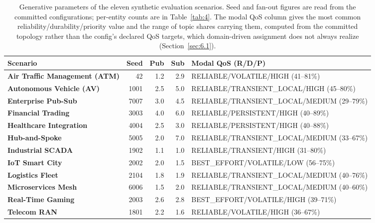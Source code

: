 \begin{table}[htbp]
\centering
\small
\caption{Generative parameters of the eleven synthetic evaluation scenarios. Seed and fan-out figures are read from the committed configurations; per-entity counts are in Table~\ref{tab:4}. The modal QoS column gives the most common reliability/durability/priority value and the range of topic shares carrying them, computed from the committed topology rather than the config's declared QoS targets, which domain-driven assignment does not always realize (Section~\ref{sec:6.1}).}
\label{tab:genparams}
\begin{tabular}{lrrrl}
\toprule
\textbf{Scenario} & \textbf{Seed} & \textbf{Pub} & \textbf{Sub} & \textbf{Modal QoS (R/D/P)} \\
\midrule
\textbf{Air Traffic Management (ATM)} & 42 & 1.2 & 2.9 & RELIABLE/VOLATILE/HIGH (41--81\%) \\
\textbf{Autonomous Vehicle (AV)} & 1001 & 2.5 & 5.0 & RELIABLE/TRANSIENT\_LOCAL/HIGH (45--80\%) \\
\textbf{Enterprise Pub-Sub} & 7007 & 3.0 & 4.5 & RELIABLE/TRANSIENT\_LOCAL/MEDIUM (29--79\%) \\
\textbf{Financial Trading} & 3003 & 4.0 & 6.0 & RELIABLE/PERSISTENT/HIGH (40--89\%) \\
\textbf{Healthcare Integration} & 4004 & 2.5 & 3.0 & RELIABLE/PERSISTENT/HIGH (40--88\%) \\
\textbf{Hub-and-Spoke} & 5005 & 2.0 & 7.0 & RELIABLE/TRANSIENT\_LOCAL/MEDIUM (33--67\%) \\
\textbf{Industrial SCADA} & 1902 & 1.1 & 1.0 & RELIABLE/TRANSIENT/HIGH (31--80\%) \\
\textbf{IoT Smart City} & 2002 & 2.0 & 1.5 & BEST\_EFFORT/VOLATILE/LOW (56--75\%) \\
\textbf{Logistics Fleet} & 2104 & 1.8 & 1.9 & RELIABLE/TRANSIENT\_LOCAL/MEDIUM (40--76\%) \\
\textbf{Microservices Mesh} & 6006 & 1.5 & 2.0 & RELIABLE/TRANSIENT\_LOCAL/MEDIUM (40--60\%) \\
\textbf{Real-Time Gaming} & 2003 & 2.6 & 2.8 & BEST\_EFFORT/VOLATILE/HIGH (39--71\%) \\
\textbf{Telecom RAN} & 1801 & 2.2 & 1.6 & RELIABLE/VOLATILE/HIGH (36--67\%) \\
\bottomrule
\end{tabular}
\end{table}
